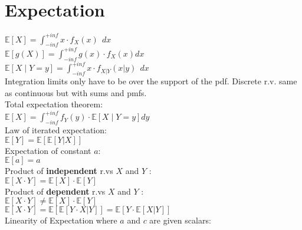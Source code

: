 \section{Expectation}

$\mathbb{E}\left[X\right]=\int_{-inf}^{+inf}{x \cdot f_X\left(x\right)\ \ dx}$\\

$\mathbb{E}\left[g\left(X\right)\right]=\int_{-inf}^{+inf}{g\left(x\right) \cdot f_X\left(x\right)dx}$\\

$\mathbb{E}\left[X\middle| Y=y\right]=\int_{-inf}^{+inf}{x \cdot { f}_{X|Y}\left(x|y\right)\ \ dx}$\\

Integration limits only have to be over the support of the pdf. Discrete r.v. same as continuous but with sums and pmfs.\\

Total expectation theorem:\\

$\mathbb{E}\left[X\right]=\int_{-inf}^{+inf}{f_Y\left(y\right)\cdot\mathbb{E}\left[X\middle| Y=y\right]dy}$\\

Law of iterated expectation:\\

$\mathbb E[Y] = \mathbb E[\mathbb E[Y\rvert {X}]]$\\

Expectation of constant $a$:\\

$\mathbb{E}[a] = a$\\

Product of \textbf{independent} r.vs $X$ and $Y$ :\\

$\mathbb{E}[X \cdot Y] = \mathbb{E}[X] \cdot \mathbb{E}[Y]$\\

Product of \textbf{dependent} r.vs $X$ and $Y$ :\\

$\mathbb{E}[X \cdot Y] \neq \mathbb{E}[X] \cdot \mathbb{E}[Y]$\\

$\mathbb{E}[X \cdot Y] = \mathbb{E}[\mathbb{E}[Y \cdot X|Y]] = \mathbb{E}[Y \cdot \mathbb{E}[X|Y]]$\\

Linearity of Expectation where $a$ and $c$ are given scalars:\\

